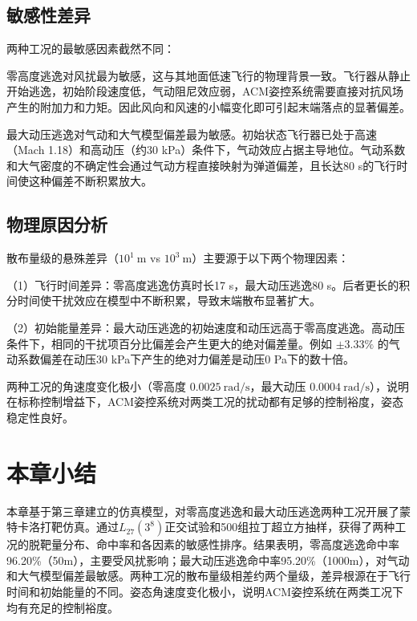 \subsection{敏感性差异}

两种工况的最敏感因素截然不同：

零高度逃逸对风扰最为敏感，这与其地面低速飞行的物理背景一致。飞行器从静止开始逃逸，初始阶段速度低，气动阻尼效应弱，ACM姿控系统需要直接对抗风场产生的附加力和力矩。因此风向和风速的小幅变化即可引起末端落点的显著偏差。

最大动压逃逸对气动和大气模型偏差最为敏感。初始状态飞行器已处于高速（Mach 1.18）和高动压（约30 kPa）条件下，气动效应占据主导地位。气动系数和大气密度的不确定性会通过气动方程直接映射为弹道偏差，且长达80 s的飞行时间使这种偏差不断积累放大。

\subsection{物理原因分析}

散布量级的悬殊差异（$10^1\ \mathrm m$ vs $10^3\ \mathrm m$）主要源于以下两个物理因素：

（1）飞行时间差异：零高度逃逸仿真时长17 s，最大动压逃逸80 s。后者更长的积分时间使干扰效应在模型中不断积累，导致末端散布显著扩大。

（2）初始能量差异：最大动压逃逸的初始速度和动压远高于零高度逃逸。高动压条件下，相同的干扰项百分比偏差会产生更大的绝对偏差量。例如 $\pm3.33\%$ 的气动系数偏差在动压30 kPa下产生的绝对力偏差是动压0 Pa下的数十倍。

 两种工况的角速度变化极小（零高度 $0.0025\ \mathrm{rad/s}$，最大动压 $0.0004\ \mathrm{rad/s}$），说明在标称控制增益下，ACM姿控系统对两类工况的扰动都有足够的控制裕度，姿态稳定性良好。

\section{本章小结}

本章基于第三章建立的仿真模型，对零高度逃逸和最大动压逃逸两种工况开展了蒙特卡洛打靶仿真。通过$L_{27}(3^8)$正交试验和500组拉丁超立方抽样，获得了两种工况的脱靶量分布、命中率和各因素的敏感性排序。结果表明，零高度逃逸命中率96.20\%（50m），主要受风扰影响；最大动压逃逸命中率95.20\%（1000m），对气动和大气模型偏差最敏感。两种工况的散布量级相差约两个量级，差异根源在于飞行时间和初始能量的不同。姿态角速度变化极小，说明ACM姿控系统在两类工况下均有充足的控制裕度。

